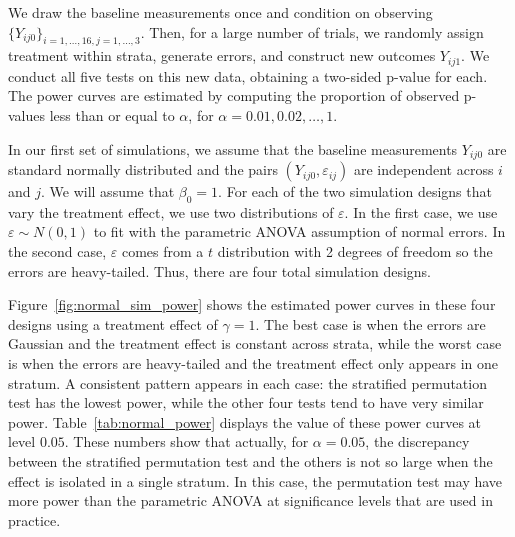\documentclass[11pt]{article}
\newcommand{\todo}[1]{{\color{red}{TO DO: \sc #1}}}
\begin{document}
We draw the baseline measurements once and condition on observing $\{ Y_{ij0}\}_{i = 1,\dots,16, j = 1,\dots, 3}$.
Then, for a large number of trials, we randomly assign treatment within strata, generate errors, and construct new outcomes $Y_{ij1}$.
We conduct all five tests on this new data, obtaining a two-sided p-value for each.
The power curves are estimated by computing the proportion of observed p-values less than or equal to $\alpha$, for $\alpha = 0.01, 0.02, \dots, 1$.

In our first set of simulations, we assume that the baseline measurements $Y_{ij0}$ are standard normally distributed and the pairs $(Y_{ij0}, \varepsilon_{ij})$ are independent across $i$ and $j$.
We will assume that $\beta_0 = 1$.
For each of the two simulation designs that vary the treatment effect, we use two distributions of $\varepsilon$.
In the first case, we use $\varepsilon \sim N(0, 1)$ to fit with the parametric ANOVA assumption of normal errors.
In the second case, $\varepsilon$ comes from a $t$ distribution with 2 degrees of freedom so the errors are heavy-tailed.
Thus, there are four total simulation designs.

Figure~\ref{fig:normal_sim_power} shows the estimated power curves in these four designs using a treatment effect of $\gamma = 1$.
The best case is when the errors are Gaussian and the treatment effect is constant across strata, while the worst case is when the errors are heavy-tailed and the treatment effect only appears in one stratum.
\todo{it makes sense that this happens as assumptions are broken in other cases}
A consistent pattern appears in each case: the stratified permutation test has the lowest power, while the other four tests tend to have very similar power.
Table~\ref{tab:normal_power} displays the value of these power curves at level $0.05$.
These numbers show that actually, for $\alpha=0.05$, the discrepancy between the stratified permutation test and the others is not so large when the effect is isolated in a single stratum.
In this case, the permutation test may have more power than the parametric ANOVA at significance levels that are used in practice.
\end{document}
